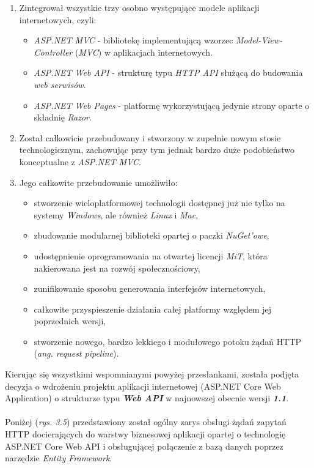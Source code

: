     \begin{enumerate}
        \item Zintegrował wszystkie trzy osobno występujące modele aplikacji internetowych, czyli:
    \begin{itemize}
        \item \textit{ASP.NET MVC} - bibliotekę implementującą wzorzec \textit{Model-View-Controller} (\textit{MVC}) w aplikacjach internetowych.
        \item \textit{ASP.NET Web API} - strukturę typu \textit{HTTP API} służącą do budowania \textit{web serwisów}.
        \item \textit{ASP.NET Web Pages} - platformę wykorzystującą jedynie strony oparte o  składnię \textit{Razor}.
    \end{itemize}
   \item Został całkowicie przebudowany i stworzony w zupełnie nowym stosie technologicznym, zachowując przy tym jednak bardzo duże podobieństwo konceptualne z \textit{ASP.NET MVC}.
    \item Jego całkowite przebudowanie umożliwiło:
        \begin{itemize}
            \item stworzenie wieloplatformowej technologii dostępnej już nie tylko na systemy \textit{Windows}, ale również \textit{Linux} i \textit{Mac},
            \item zbudowanie modularnej biblioteki opartej o paczki \textit{NuGet'owe},
            \item udostępnienie oprogramowania na otwartej licencji \textit{MiT}, która nakierowana jest na rozwój społecznościowy,
            \item zunifikowanie sposobu generowania interfejsów internetowych,
            \item całkowite przyspieszenie działania całej platformy względem jej poprzednich wersji,
            \item stworzenie nowego, bardzo lekkiego i modułowego potoku żądań HTTP (\textit{ang. request pipeline}).
        \end{itemize}
    \end{enumerate}
    Kierując się wszystkimi wspomnianymi powyżej przesłankami, została podjęta decyzja o wdrożeniu projektu aplikacji internetowej (ASP.NET Core Web Application) o strukturze typu \textbf{\textit{Web API}} w najnowszej obecnie wersji \textbf{\textit{1.1}}.\\
    \\
    Poniżej (\textit{rys. 3.5}) przedstawiony został ogólny zarys
    obsługi żądań zapytań HTTP docierających do warstwy biznesowej aplikacji opartej o technologię ASP.NET Core Web API i obsługującej połączenie z bazą danych poprzez narzędzie \textit{Entity Framework}.

